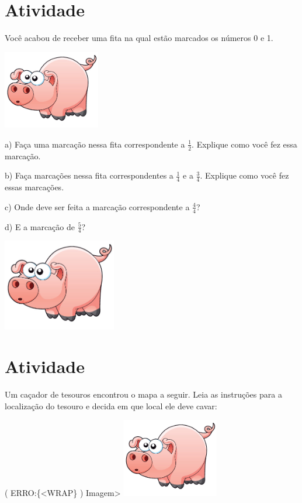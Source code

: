 \documentclass[a4,12pt]{book}
\begin{document}
\section{Atividade}








Você acabou de receber uma fita na qual estão marcados os números 0 e 1.

\includegraphics[width=120pt, keepaspectratio]{pig}

a) Faça uma marcação nessa fita correspondente a $\frac{1}{2}$. Explique como você fez essa marcação.

b) Faça marcações nessa fita correspondentes a $\frac{1}{4}$ e a $\frac{3}{4}$. Explique como você fez essas marcações.

c) Onde deve ser feita a marcação correspondente a $\frac{4}{4}$?

d) E a marcação de $\frac{5}{4}$?




\includegraphics[width=\textwidth,height=4cm, keepaspectratio]{pig}
\section{Atividade}






Um caçador de tesouros encontrou o mapa a seguir. Leia as instruções para a localização do tesouro e decida em que local ele deve cavar:

( ERRO:\{<WRAP\} ) Imagem>
\includegraphics[width=120pt, keepaspectratio]{pig}
\end{document}
